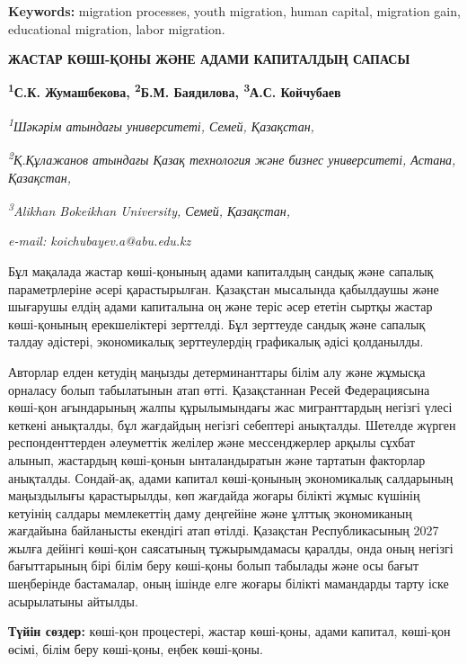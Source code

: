 {\bfseries Keywords:} migration processes, youth migration, human capital,
migration gain, educational migration, labor migration.

\begin{articleheader}
{\bfseries ЖАСТАР КӨШІ-ҚОНЫ ЖӘНЕ АДАМИ КАПИТАЛДЫҢ САПАСЫ}

{\bfseries
\textsuperscript{1}С.К. Жумашбекова,
\textsuperscript{2}Б.М. Баядилова,
\textsuperscript{3}А.С. Койчубаев\textsuperscript{\envelope }}
\end{articleheader}

\begin{affiliation}
\emph{\textsuperscript{1}Шәкәрім атындағы университеті, Семей, Қазақстан,}

\emph{\textsuperscript{2}Қ.Құлажанов атындағы Қазақ технология және бизнес университеті, Астана, Қазақстан,}

\emph{\textsuperscript{3}Alikhan Bokeikhan University, Семей, Қазақстан,}

\emph{e-mail: koichubayev.a@abu.edu.kz}
\end{affiliation}

Бұл мақалада жастар көші-қонының адами капиталдың сандық және сапалық
параметрлеріне әсері қарастырылған. Қазақстан мысалында қабылдаушы және
шығарушы елдің адами капиталына оң және теріс әсер ететін сыртқы жастар
көші-қонының ерекшеліктері зерттелді. Бұл зерттеуде сандық және сапалық
талдау әдістері, экономикалық зерттеулердің графикалық әдісі қолданылды.

Авторлар елден кетудің маңызды детерминанттары білім алу және жұмысқа
орналасу болып табылатынын атап өтті. Қазақстаннан Ресей Федерациясына
көші-қон ағындарының жалпы құрылымындағы жас мигранттардың негізгі үлесі
кеткені анықталды, бұл жағдайдың негізгі себептері анықталды. Шетелде
жүрген респонденттерден әлеуметтік желілер және мессенджерлер арқылы
сұхбат алынып, жастардың көші-қонын ынталандыратын және тартатын
факторлар анықталды. Сондай-ақ, адами капитал көші-қонының экономикалық
салдарының маңыздылығы қарастырылды, көп жағдайда жоғары білікті жұмыс
күшінің кетуінің салдары мемлекеттің даму деңгейіне және ұлттық
экономиканың жағдайына байланысты екендігі атап өтілді. Қазақстан
Республикасының 2027 жылға дейінгі көші-қон саясатының тұжырымдамасы
қаралды, онда оның негізгі бағыттарының бірі білім беру көші-қоны болып
табылады және осы бағыт шеңберінде бастамалар, оның ішінде елге жоғары
білікті мамандарды тарту іске асырылатыны айтылды.

{\bfseries Түйін сөздер:} көші-қон процестері, жастар көші-қоны, адами
капитал, көші-қон өсімі, білім беру көші-қоны, еңбек көші-қоны.

